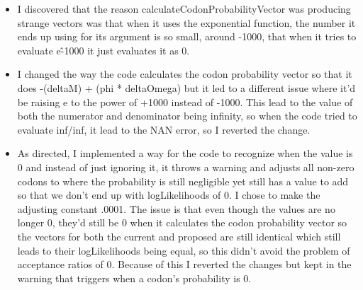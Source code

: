 \documentclass[11pt]{labbook}
\begin{document}
    \begin{itemize}
        \item I discovered that the reason calculateCodonProbabilityVector was producing strange vectors was that when it uses the exponential function, the number it ends up using for its argument is so small, around -1000, that when it tries to evaluate e\^-1000 it just evaluates it as 0.
        \item I changed the way the code calculates the codon probability vector so that it does -(deltaM) + (phi * deltaOmega) but it led to a different issue where it'd be raising e to the power of +1000 instead of -1000. This lead to the value of both the numerator and denominator being infinity, so when the code tried to evaluate inf/inf, it lead to the NAN error, so I reverted the change.
        \item As directed, I implemented a way for the code to recognize when the value is 0 and instead of just ignoring it, it throws a warning and adjusts all non-zero codons to where the probability is still negligible yet still has a value to add so that we don't end up with logLikelihoods of 0. I chose to make the adjusting constant .0001. The issue is that even though the values are no longer 0, they'd still be 0 when it calculates the codon probability vector so the vectors for both the current and proposed are still identical which still leads to their logLikelihoods being equal, so this didn't avoid the problem of acceptance ratios of 0. Because of this I reverted the changes but kept in the warning that triggers when a codon's probability is 0.
    \end{itemize}
    
\end{document}
